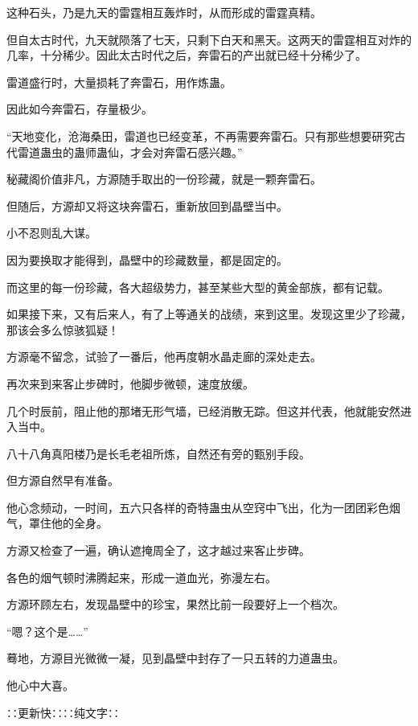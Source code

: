 \begin{this_body}
这种石头，乃是九天的雷霆相互轰炸时，从而形成的雷霆真精。

但自太古时代，九天就陨落了七天，只剩下白天和黑天。这两天的雷霆相互对炸的几率，十分稀少。因此太古时代之后，奔雷石的产出就已经十分稀少了。

雷道盛行时，大量损耗了奔雷石，用作炼蛊。

因此如今奔雷石，存量极少。

“天地变化，沧海桑田，雷道也已经变革，不再需要奔雷石。只有那些想要研究古代雷道蛊虫的蛊师蛊仙，才会对奔雷石感兴趣。”

秘藏阁价值非凡，方源随手取出的一份珍藏，就是一颗奔雷石。

但随后，方源却又将这块奔雷石，重新放回到晶壁当中。

小不忍则乱大谋。

因为要换取才能得到，晶壁中的珍藏数量，都是固定的。

而这里的每一份珍藏，各大超级势力，甚至某些大型的黄金部族，都有记载。

如果接下来，又有后来人，有了上等通关的战绩，来到这里。发现这里少了珍藏，那该会多么惊骇狐疑！

方源毫不留念，试验了一番后，他再度朝水晶走廊的深处走去。

再次来到来客止步碑时，他脚步微顿，速度放缓。

几个时辰前，阻止他的那堵无形气墙，已经消散无踪。但这并代表，他就能安然进入当中。

八十八角真阳楼乃是长毛老祖所炼，自然还有旁的甄别手段。

但方源自然早有准备。

他心念频动，一时间，五六只各样的奇特蛊虫从空窍中飞出，化为一团团彩色烟气，罩住他的全身。

方源又检查了一遍，确认遮掩周全了，这才越过来客止步碑。

各色的烟气顿时沸腾起来，形成一道血光，弥漫左右。

方源环顾左右，发现晶壁中的珍宝，果然比前一段要好上一个档次。

“嗯？这个是……”

蓦地，方源目光微微一凝，见到晶壁中封存了一只五转的力道蛊虫。

他心中大喜。

∷更新快∷∷纯文字∷

\end{this_body}

